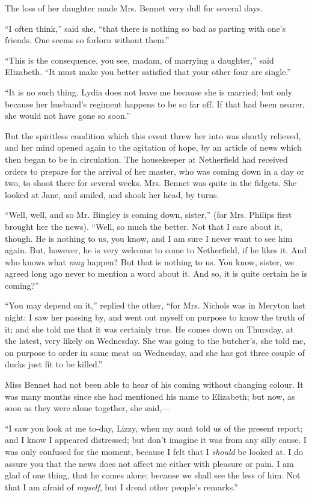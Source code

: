 The loss of her daughter made Mrs. Bennet very dull for several days.

``I often think,'' said she, ``that there is nothing so bad as parting with one's friends. One seems so forlorn without them.''

``This is the consequence, you see, madam, of marrying a daughter,'' said Elizabeth. ``It must make you better satisfied that your other four are single.''

``It is no such thing. Lydia does not leave me because she is married; but only because her husband's regiment happens to be so far off. If that had been nearer, she would not have gone so soon.''

But the spiritless condition which this event threw her into was shortly relieved, and her mind opened again to the agitation of hope, by an article of news which then began to be in circulation. The housekeeper at Netherfield had received orders to prepare for the arrival of her master, who was coming down in a day or two, to shoot there for several weeks. Mrs. Bennet was quite in the fidgets. She looked at Jane, and smiled, and shook her head, by turns.

``Well, well, and so Mr. Bingley is coming down, sister,'' (for Mrs. Philips first brought her the news). ``Well, so much the better. Not that I care about it, though. He is nothing to us, you know, and I am sure I never want to see him again. But, however, he is very welcome to come to Netherfield, if he likes it. And who knows what \textit{may} happen? But that is nothing to us. You know, sister, we agreed long ago never to mention a word about it. And so, it is quite certain he is coming?''

``You may depend on it,'' replied the other, ``for Mrs. Nichols was in Meryton last night: I saw her passing by, and went out myself on purpose to know the truth of it; and she told me that it was certainly true. He comes down on Thursday, at the latest, very likely on Wednesday. She was going to the butcher's, she told me, on purpose to order in some meat on Wednesday, and she has got three couple of ducks just fit to be killed.''

Miss Bennet had not been able to hear of his coming without changing colour. It was many months since she had mentioned his name to Elizabeth; but now, as soon as they were alone together, she said,---

``I saw you look at me to-day, Lizzy, when my aunt told us of the present report; and I know I appeared distressed; but don't imagine it was from any silly cause. I was only confused for the moment, because I felt that I \textit{should} be looked at. I do assure you that the news does not affect me either with pleasure or pain. I am glad of one thing, that he comes alone; because we shall see the less of him. Not that I am afraid of \textit{myself}, but I dread other people's remarks.''

